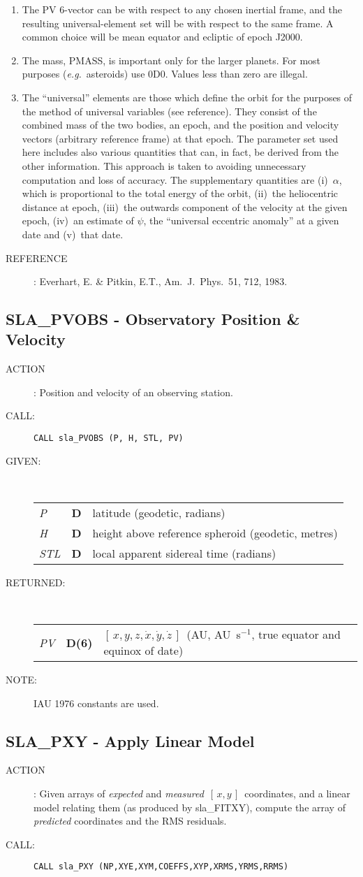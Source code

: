 \documentclass[11pt,twoside]{article}
\newcommand{\xlabel}[1]{}
\newcommand{\xy}        {$[\,x,y\,]$}
\newcommand{\xyzxyzd}   {$[\,x,y,z,\dot{x},\dot{y},\dot{z}\,]$}
\newcommand{\routine}[3]
{\hbadness=10000
  \vbox
  {
    \rule{\textwidth}{0.3mm}\\
    {\Large {\bf #1} \hfill #2 \hfill {\bf #1}}\\
    \setlength{\oldspacing}{\topsep}
    \setlength{\topsep}{0.3ex}
    \begin{description}
      #3
    \end{description}
    \setlength{\topsep}{\oldspacing}
  }
}
\renewcommand{\routine}[3]
   {
      \subsection{#1\xlabel{#1} - #2\label{#1}}
       \begin{description}
         #3
       \end{description}
   }
\newcommand{\action}[1]
{\item[ACTION]: #1}
\newcommand{\action}[1]
   {\item[ACTION:] #1}
\newcommand{\call}[1]
{\item[CALL]: \hspace{0.4em}{\tt #1}}
\newlength{\oldspacing}
\renewcommand{\call}[1]
   {
    \item[CALL:] {\tt #1}
   }
\newcommand{\args}[2]
{
  \goodbreak
  \setlength{\oldspacing}{\topsep}
  \setlength{\topsep}{0.3ex}
  \begin{description}
  \item[#1]:\\[1.5ex]
    \begin{tabular}{p{7em}p{6em}p{22em}}
      #2
    \end{tabular}
  \end{description}
  \setlength{\topsep}{\oldspacing}
}
\renewcommand{\args}[2]
   {
     \begin{description}
        \item[#1:]\\
        \begin{tabular}{p{7em}p{6em}l}
           #2
        \end{tabular}
     \end{description}
   }
\newcommand{\spec}[3]
{
  {\em {#1}} & {\bf \mbox{#2}} & {#3}
}
\newcommand{\anote}[1]
{
  \goodbreak
  \setlength{\oldspacing}{\topsep}
  \setlength{\topsep}{0.3ex}
  \begin{description}
    \item[NOTE]:
        #1
  \end{description}
  \setlength{\topsep}{\oldspacing}
}
\renewcommand{\anote}[1]
   {
      \begin{description}
      \item[NOTE:]
          #1
      \end{description}
   }
\newcommand{\aref}[1]
{
  \goodbreak
  \setlength{\oldspacing}{\topsep}
  \setlength{\topsep}{0.3ex}
  \begin{description}
    \item[REFERENCE]:
        #1
  \end{description}
  \setlength{\topsep}{\oldspacing}
}
\newcommand{\aref}[1]
   {
     \begin{description}
       \item[REFERENCE:]
           #1
     \end{description}
   }
\begin{document}
{
 \begin{enumerate}
  \item The PV 6-vector can be with respect to any chosen inertial frame,
        and the resulting universal-element set will be with respect to
        the same frame.  A common choice will be mean equator and ecliptic
        of epoch J2000.
  \item The mass, PMASS, is important only for the larger planets.  For
        most purposes ({\it e.g.}~asteroids) use 0D0.  Values less than zero
        are illegal.
  \item The ``universal'' elements are those which define the orbit for the
        purposes of the method of universal variables (see reference).
        They consist of the combined mass of the two bodies, an epoch,
        and the position and velocity vectors (arbitrary reference frame)
        at that epoch.  The parameter set used here includes also various
        quantities that can, in fact, be derived from the other
        information.  This approach is taken to avoiding unnecessary
        computation and loss of accuracy.  The supplementary quantities
        are (i)~$\alpha$, which is proportional to the total energy of the
        orbit, (ii)~the heliocentric distance at epoch,
        (iii)~the outwards component of the velocity at the given epoch,
        (iv)~an estimate of $\psi$, the ``universal eccentric anomaly'' at a
        given date and (v)~that date.
 \end{enumerate}
}
\aref{Everhart, E. \& Pitkin, E.T., Am.~J.~Phys.~51, 712, 1983.}
\routine{SLA\_PVOBS}{Observatory Position \& Velocity}
{
 \action{Position and velocity of an observing station.}
 \call{CALL sla\_PVOBS (P, H, STL, PV)}
}
\args{GIVEN}
{
 \spec{P}{D}{latitude (geodetic, radians)} \\
 \spec{H}{D}{height above reference spheroid (geodetic, metres)} \\
 \spec{STL}{D}{local apparent sidereal time (radians)}
}
\args{RETURNED}
{
 \spec{PV}{D(6)}{\xyzxyzd\ (AU, AU~s$^{-1}$, true equator and equinox
                                                            of date)}
}
\anote{IAU 1976 constants are used.}
\routine{SLA\_PXY}{Apply Linear Model}
{
 \action{Given arrays of {\it expected}\/ and {\it measured}\,
         \xy\ coordinates, and a
         linear model relating them (as produced by sla\_FITXY), compute
         the array of {\it predicted}\/ coordinates and the RMS residuals.}
 \call{CALL sla\_PXY (NP,XYE,XYM,COEFFS,XYP,XRMS,YRMS,RRMS)}
}
\end{document}
